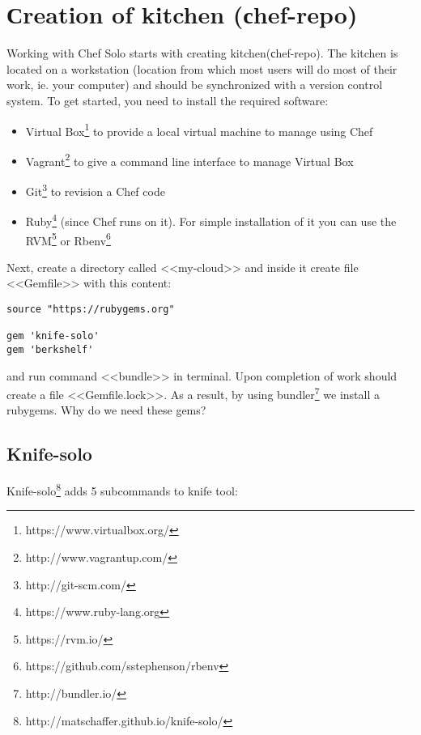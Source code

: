 \section{Сreation of kitchen (сhef-repo)}

Working with Chef Solo starts with creating kitchen(сhef-repo). The kitchen is located on a workstation (location from which most users will do most of their work, ie. your computer) and should be synchronized with a version control system. To get started, you need to install the required software:

\begin{itemize}
  \item Virtual Box\footnote{https://www.virtualbox.org/} to provide a local virtual machine to manage using Chef
  \item Vagrant\footnote{http://www.vagrantup.com/} to give a command line interface to manage Virtual Box
  \item Git\footnote{http://git-scm.com/} to revision a Chef code
  \item Ruby\footnote{https://www.ruby-lang.org} (since Chef runs on it). For simple installation of it you can use the RVM\footnote{https://rvm.io/} or Rbenv\footnote{https://github.com/sstephenson/rbenv}
\end{itemize}

Next, create a directory called <<my-cloud>> and inside it create file <<Gemfile>> with this content:

\begin{lstlisting}[label=lst:my-cloud-kitchen1,title=my-cloud/Gemfile]
source "https://rubygems.org"

gem 'knife-solo'
gem 'berkshelf'
\end{lstlisting}

and run command <<bundle>> in terminal. Upon completion of work should create a file <<Gemfile.lock>>. As a result, by using bundler\footnote{http://bundler.io/} we install a rubygems. Why do we need these gems?

\subsection{Knife-solo}

Knife-solo\footnote{http://matschaffer.github.io/knife-solo/} adds 5 subcommands to knife tool:

